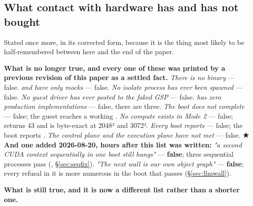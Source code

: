 \documentclass[10.5pt]{article}
\begin{document}
\subsection{\texorpdfstring{What contact with hardware has and has not bought}{What contact with hardware has and has not bought}}
\label{sec:contact}

Stated once more, in its corrected form, because it is the thing most likely to be
half-remembered between here and the end of the paper.

\textbf{What is no longer true, and every one of these was printed by a previous revision of this
paper as a settled fact.} \emph{There is no binary} — false. \emph{ and
 have only mocks} — false. \emph{No isolate process has ever been spawned} —
false. \emph{No guest driver has ever posted to the faked GSP} — false. \emph{ has zero
production implementations} — false, there are three. \emph{The boot does not complete} — false;
the guest reaches a working . \emph{No compute exists in Mode 2} — false;
 returns 43 and  is byte-exact at 2048² and 3072². \emph{Every boot reports
} — false; the  boot reports . \emph{The control plane and the execution plane have not met} — false.
\textbf{★ And one added 2026-08-20, hours after this list was written:} \emph{"a second CUDA
context sequentially in one boot still hangs"} — \textbf{false}; three sequential processes pass
(, \S\ref{sec:seqfix}). \emph{"The next wall is our own object graph"} —
\textbf{false}; every refusal in it is more numerous in the boot that passes
(\S\ref{sec:llmwall}).

\textbf{What is still true, and it is now a different list rather than a shorter one.}
\end{document}
